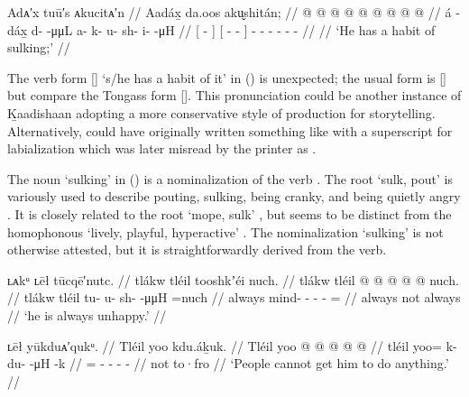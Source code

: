\ex\label{ex:106-17-sulking}%
%
\begingl
	\glpreamble	Adᴀ′x tuū′s ᴀkucitᴀ′n //
	\glpreamble	Aadáx̱ da.oos aku̬shitán; //
	\gla	{}  @ {} {}
			{}  @ {} @ {} {}
			 @ {} @ {} @ {} @ {} @ {} @ {} //
	\glb	{} á -dáx̱ {}
			{} d-  -μμL {}
			a- k- u- sh- i-  -μH //
	\glc	{}[  - {}]
			{}[ -  - {}]
			- - - - -  - //
	\gld	 {}  {} {}
			{}  {} {} {} 
			 {} {} {} {} {} {} //
	\glft	‘He has a habit of sulking;’
		//
\endgl
\xe

The verb form  [] ‘s/he has a habit of it’ in (\lastx) is unexpected; the usual form  is  [] but compare the Tongass form  [].
This pronunciation could be another instance of Ḵaadishaan adopting a more conservative style of production for storytelling.
Alternatively, \citeauthor{swanton:1909} could have originally written something like  with a superscript  for labialization which was later misread by the printer as .

The noun  ‘sulking’ in (\lastx) is a nominalization of the verb .
The root  ‘sulk, pout’ is variously used to describe pouting, sulking, being cranky, and being quietly angry \parencites[02/325]{leer:1973}[156]{leer:1976}.
It is closely related to the root  ‘mope, sulk’ \parencites[02/333]{leer:1973}[160]{leer:1976}, but seems to be distinct from the homophonous  ‘lively, playful, hyperactive’ \parencites[02/327]{leer:1973}.
The nominalization  ‘sulking’ is not otherwise attested, but it is straightforwardly derived from the verb.

\ex\label{ex:106-18-unhappy}%
%
\begingl
	\glpreamble	ʟᴀkᵘ ʟēł tūcqē′nutc. //
	\glpreamble	tlákw tléil tooshkʼéi nuch. //
	\gla	tlákw tléil  @ {} @ {} @ {} @ {} @ \•nuch. //
	\glb	tlákw tléil tu- u- sh-  -μμH =nuch //
	\glc	always  mind- - -  - = //
	\gld	always not  {} {} {} {} \•always //
	\glft	‘he is always unhappy.’
		//
\endgl
\xe

\ex\label{ex:106-19-cant-direct}%
%
\begingl
	\glpreamble	ʟēł yūkduᴀ′qukᵘ. //
	\glpreamble	Tléil yoo kdu.áḵuk. //
	\gla	Tléil yoo @  @ {} @ {} @ {} @ {} //
	\glb	tléil yoo= k- du-  -μH -k //
	\glc	{} = - -  - - //
	\gld	not to·fro  {} {} {} {} //
	\glft	‘People cannot get him to do anything.’
		//
\endgl
\xe

